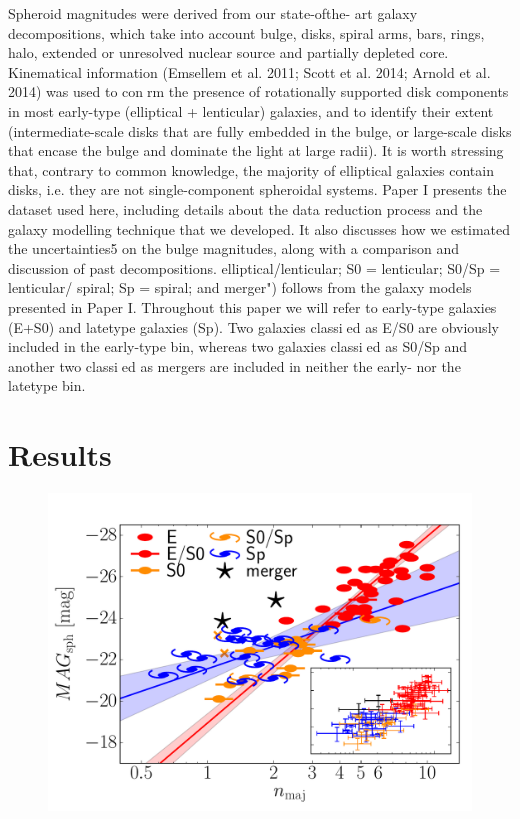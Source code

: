 \documentclass[preprint2]{emulateapj}
\begin{document}
Spheroid magnitudes were derived from our state-ofthe-
art galaxy decompositions, which take into account
bulge, disks, spiral arms, bars, rings, halo, extended or
unresolved nuclear source and partially depleted core.
Kinematical information (Emsellem et al. 2011; Scott
et al. 2014; Arnold et al. 2014) was used to conrm the
presence of rotationally supported disk components in
most early-type (elliptical + lenticular) galaxies, and to
identify their extent (intermediate-scale disks that are
fully embedded in the bulge, or large-scale disks that encase
the bulge and dominate the light at large radii).
It is worth stressing that, contrary to common knowledge,
the majority of elliptical galaxies contain disks,
i.e. they are not single-component spheroidal systems.
Paper I presents the dataset used here, including details
about the data reduction process and the galaxy modelling
technique that we developed. It also discusses how
we estimated the uncertainties5 on the bulge magnitudes,
along with a comparison and discussion of past decompositions.
elliptical/lenticular; S0 = lenticular; S0/Sp = lenticular/
spiral; Sp = spiral; and merger") follows from the
galaxy models presented in Paper I. Throughout this paper
we will refer to early-type galaxies (E+S0) and latetype
galaxies (Sp). Two galaxies classied as E/S0 are
obviously included in the early-type bin, whereas two
galaxies classied as S0/Sp and another two classied as
mergers are included in neither the early- nor the latetype
bin.






\section{Results}


\begin{figure}[h]
\begin{center}
\includegraphics[width=\columnwidth]{images/mag_vs_n_maj.pdf}
\caption{}
\label{fig:magn}
\end{center}
\end{figure}
\end{document}

